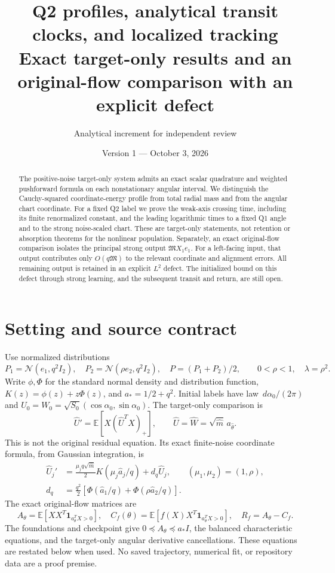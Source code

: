 \documentclass[11pt]{article}
\title{Q2 profiles, analytical transit clocks, and localized tracking\\
\large Exact target-only results and an original-flow comparison with an explicit defect}
\author{Analytical increment for independent review}\date{Version 1 --- October 3, 2026}
\numberwithin{equation}{section}
\theoremstyle{remark}\newtheorem{remark}[theorem]{Remark}
\newcommand{\dd}{\,d}\newcommand{\E}{\mathbb E}\newcommand{\R}{\mathbb R}
\begin{document}
\maketitle
\begin{abstract}
The positive-noise target-only system admits an exact scalar quadrature and
weighted pushforward formula on each nonstationary angular interval. We
distinguish the Cauchy-squared coordinate-energy profile from total radial
mass and from the angular chart coordinate. For a fixed Q2 label we prove
the weak-axis crossing time, including its finite renormalized constant,
and the leading logarithmic times to a fixed Q1 angle and to the strong
noise-scaled chart. These are target-only statements, not retention or
absorption theorems for the nonlinear population. Separately, an exact
original-flow comparison isolates the principal strong output
$\mathfrak M X_1e_1$. For a left-facing input, that output contributes only
$O(q\mathfrak M)$ to the relevant coordinate and alignment errors. All
remaining output is retained in an explicit $L^2$ defect. The initialized
bound on this defect through strong learning, and the subsequent transit
and return, are still open.
\end{abstract}

\section{Setting and source contract}\label{inc:AN02:q2:v1:setting}
Use normalized distributions
\[
 P_1=\mathcal N(e_1,q^2I_2),\quad
 P_2=\mathcal N(\rho e_2,q^2I_2),\quad P=(P_1+P_2)/2,
 \qquad 0<\rho<1,\quad\lambda=\rho^2.
\]
Write $\phi,\Phi$ for the standard normal density and distribution function,
$K(z)=\phi(z)+z\Phi(z)$, and $a_* =1/2+q^2$.
Initial labels have law $\dd\alpha_0/(2\pi)$ and
$U_0=W_0=\sqrt{S_0}(\cos\alpha_0,\sin\alpha_0)$.
The target-only comparison is
\begin{equation}\label{inc:AN02:q2:v1:target}
 \widehat U'=\E[X(\widehat U^TX)_+],\qquad
 \widehat U=\widehat W=\sqrt{\widehat m}\,a_{\widehat\theta}.
\end{equation}
This is not the original residual equation. Its exact finite-noise
coordinate formula, from Gaussian integration, is
\begin{align}
 \widehat U_j'&=\frac{\mu_j q\sqrt{\widehat m}}2
           K(\mu_j\widehat a_j/q)+d_q\widehat U_j,
           \qquad (\mu_1,\mu_2)=(1,\rho),\nonumber\\
 d_q&=\frac{q^2}{2}[\Phi(\widehat a_1/q)+\Phi(\rho\widehat a_2/q)].
 \label{inc:AN02:q2:v1:coordinates}
\end{align}
The exact original-flow matrices are
\[
 A_\theta=\E[XX^T\mathbf1_{a_\theta^TX>0}],\quad
 C_f(\theta)=\E[f(X)X^T\mathbf1_{a_\theta^TX>0}],\quad
 R_f=A_\theta-C_f.
\]
The foundations and checkpoint give
$0\preceq A_\theta\preceq a_*I$, the balanced characteristic equations,
and the target-only angular derivative cancellations. These equations
are restated below when used. No saved trajectory, numerical fit, or
repository data are a proof premise.
\end{document}
